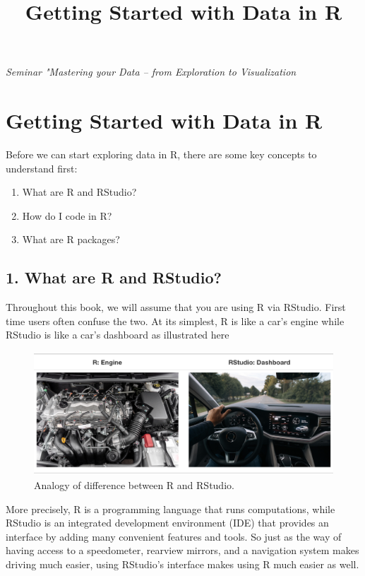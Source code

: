\documentclass[
]{article}
\title{Getting Started with Data in R}
\author{}
\date{\vspace{-2.5em}}
\providecommand{\tightlist}{%
  \setlength{\itemsep}{0pt}\setlength{\parskip}{0pt}}
\begin{document}
\maketitle

\emph{Seminar "Mastering your Data -- from Exploration to Visualization}

\hypertarget{getting-started}{%
\section{Getting Started with Data in R}\label{getting-started}}

Before we can start exploring data in R, there are some key concepts to
understand first:

\begin{enumerate}
\def\labelenumi{\arabic{enumi}.}
\tightlist
\item
  What are R and RStudio?
\item
  How do I code in R?
\item
  What are R packages?
\end{enumerate}

\hypertarget{what-are-r-and-rstudio}{%
\subsection{1. What are R and RStudio?}\label{what-are-r-and-rstudio}}

Throughout this book, we will assume that you are using R via RStudio.
First time users often confuse the two. At its simplest, R is like a
car's engine while RStudio is like a car's dashboard as illustrated here

\begin{figure}
\centering
\includegraphics{../Figs/r_vs_rstudio_1.png}
\caption{Analogy of difference between R and RStudio.}
\end{figure}

More precisely, R is a programming language that runs computations,
while RStudio is an integrated development environment (IDE) that
provides an interface by adding many convenient features and tools. So
just as the way of having access to a speedometer, rearview mirrors, and
a navigation system makes driving much easier, using RStudio's interface
makes using R much easier as well.
\end{document}
